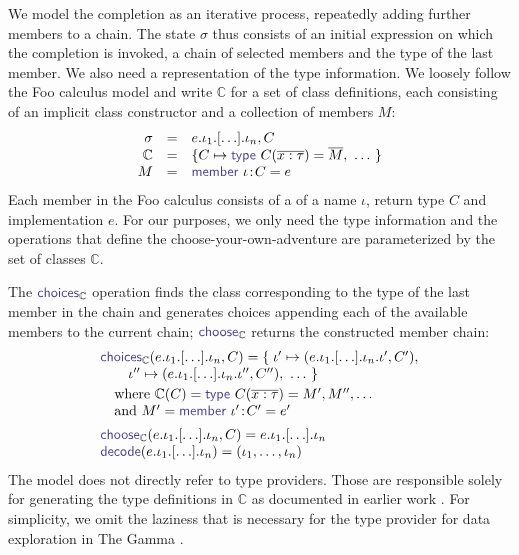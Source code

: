 \documentclass[nonacm,anonymous,sigplan,screen]{acmart}
\newcommand{\ident}[1]{\textsf{\color{DarkSlateBlue}{#1}}}
\newcommand{\select}{\textnormal{\ident{choose}}}
\newcommand{\choices}{\textnormal{\ident{choices}}}
\begin{document}
We model the completion as an iterative process, repeatedly adding further
members to a chain. The state $\sigma$ thus consists of an initial expression on which the
completion is invoked, a chain of selected members and the type of the last member.
We also need a representation of the type information. We loosely
follow the Foo calculus model \cite{petricek-2016-fsdata} and write $\mathbb{C}$ for a set
of class definitions, each consisting of an implicit class constructor and a collection of
members $M$:
\[
\begin{array}{rcl}
\sigma &=& e . \iota_1 . \lbrack\ldots\rbrack . \iota_n, C\\
\mathbb{C} &=& \{ C \mapsto \ident{type}~C(\overline{x:\tau}) = \overline{M},~\ldots~ \}\\
M &=& \ident{member}~\iota\!:\!C=e
\end{array}
\]
Each member in the Foo calculus consists of a of a name $\iota$, return type $C$ and implementation
$e$. For our purposes, we only need the type information and the operations that define the
choose-your-own-adventure are parameterized by the set of classes $\mathbb{C}$.

The $\choices_\mathbb{C}$ operation finds the class corresponding to the type of the
last member in the chain and generates choices appending each of the available
members to the current chain; $\select_\mathbb{C}$ returns the constructed
member chain:
\[
\begin{array}{l}
\choices_\mathbb{C}(e . \iota_1 . \lbrack\ldots\rbrack . \iota_n, C) =
  \{\; \iota' \mapsto (e . \iota_1 . \lbrack\ldots\rbrack . \iota_n . \iota', C'),\\
  \qquad \iota'' \mapsto (e . \iota_1 . \lbrack\ldots\rbrack . \iota_n . \iota'', C''), ~\ldots~\}\\[0.25em]
\quad \textnormal{where}~\mathbb{C}(C) = \ident{type}~C(\overline{x:\tau}) = M', M'', \ldots\\
\quad \textnormal{and}~M' = \ident{member}~\iota'\!:\!C'=e'\\[0.5em]
\select_\mathbb{C}(e . \iota_1 . \lbrack\ldots\rbrack . \iota_n, C) = e . \iota_1 . \lbrack\ldots\rbrack . \iota_n\\
\ident{decode}(e . \iota_1 . \lbrack\ldots\rbrack . \iota_n) = (\iota_1, \ldots, \iota_n)
\end{array}
\]
The model does not directly refer to type providers. Those are responsible solely for generating
the type definitions in $\mathbb{C}$ as documented in earlier work \cite{petricek-2016-fsdata}.
For simplicity, we omit the laziness that is necessary for the type provider for data exploration
in The Gamma \cite{petricek-2017-dotdriven}.
\end{document}
